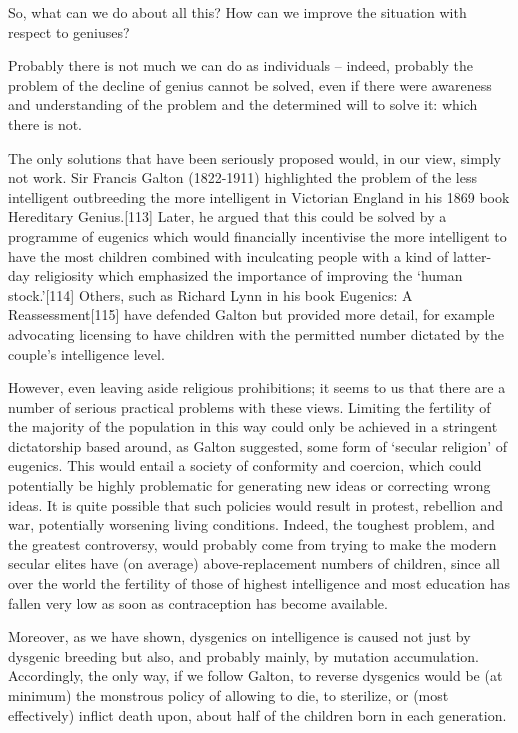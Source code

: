 \documentclass[
]{book}
\begin{document}
So, what can we do about all this? How can we improve the situation with respect to geniuses?

Probably there is not much we can do as individuals -- indeed, probably the problem of the decline of genius cannot be solved, even if there were awareness and understanding of the problem and the determined will to solve it: which there is not.

The only solutions that have been seriously proposed would, in our view, simply not work. Sir Francis Galton (1822-1911) highlighted the problem of the less intelligent outbreeding the more intelligent in Victorian England in his 1869 book Hereditary Genius.{[}113{]} Later, he argued that this could be solved by a programme of eugenics which would financially incentivise the more intelligent to have the most children combined with inculcating people with a kind of latter-day religiosity which emphasized the importance of improving the `human stock.'{[}114{]} Others, such as Richard Lynn in his book Eugenics: A Reassessment{[}115{]} have defended Galton but provided more detail, for example advocating licensing to have children with the permitted number dictated by the couple's intelligence level.

However, even leaving aside religious prohibitions; it seems to us that there are a number of serious practical problems with these views. Limiting the fertility of the majority of the population in this way could only be achieved in a stringent dictatorship based around, as Galton suggested, some form of `secular religion' of eugenics. This would entail a society of conformity and coercion, which could potentially be highly problematic for generating new ideas or correcting wrong ideas. It is quite possible that such policies would result in protest, rebellion and war, potentially worsening living conditions. Indeed, the toughest problem, and the greatest controversy, would probably come from trying to make the modern secular elites have (on average) above-replacement numbers of children, since all over the world the fertility of those of highest intelligence and most education has fallen very low as soon as contraception has become available.

Moreover, as we have shown, dysgenics on intelligence is caused not just by dysgenic breeding but also, and probably mainly, by mutation accumulation. Accordingly, the only way, if we follow Galton, to reverse dysgenics would be (at minimum) the monstrous policy of allowing to die, to sterilize, or (most effectively) inflict death upon, about half of the children born in each generation.
\end{document}
